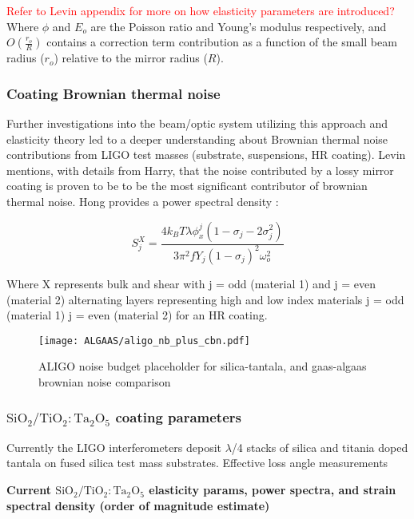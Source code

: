 {\textcolor{red}{Refer to Levin appendix for more on how elasticity parameters are introduced?} Where $\phi$ and $E_o$ are the Poisson ratio and Young's modulus respectively, and $O(\frac{r_o}{R})$ contains a correction term contribution as a function of the small beam radius ($r_o$) relative to the mirror radius ($R$).

\subsubsection{Coating Brownian thermal noise}
Further investigations into the beam/optic system utilizing this approach and elasticity theory led to a deeper understanding about Brownian thermal noise contributions from LIGO test masses (substrate, suspensions, HR coating). Levin mentions, with details from Harry, that the noise contributed by a lossy mirror coating is proven to be to be the most significant contributor of brownian thermal noise. Hong provides a power spectral density \cite{Hong:2013}:

\begin{equation}
S_j^X = \frac{4k_B T \lambda \phi_x^j(1- \sigma_j - 2 \sigma_j^2)}{3 \pi^2 f Y_j (1-\sigma_j)^2 \omega_o^2}
\end{equation}

Where X represents bulk and shear with j = odd (material 1) and j = even (material 2) alternating layers representing high and low index materials j = odd (material 1) j = even (material 2) for an HR coating.

\begin{figure}[H]
    \begin{center}
    \texttt{[image: ALGAAS/aligo\_nb\_plus\_cbn.pdf]}
    \end{center}
    \caption{ALIGO noise budget placeholder for silica-tantala, and gaas-algaas brownian noise comparison}
\label{fig:aligo_tn_comparison}
\end{figure}

\subsubsection{$\mathrm{SiO_2}/\mathrm{TiO_2:Ta_2O_5}$ coating parameters}
Currently the LIGO interferometers deposit $\lambda$/4 stacks of silica and titania doped tantala on fused silica test mass substrates. Effective loss angle measurements \cite{Harry:06}

\textbf{Current $\mathrm{SiO_2}/\mathrm{TiO_2:Ta_2O_5}$ elasticity params, power spectra, and strain spectral density (order of magnitude estimate)}

}
